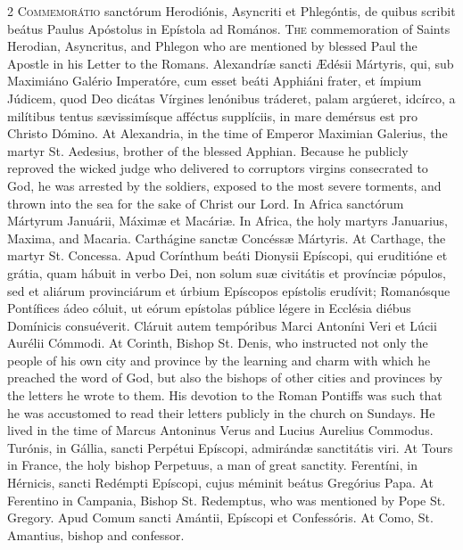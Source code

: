 \begin{paracol}{2}
\lettrine[lines=2]{C}{ommemorátio} sanctórum 
 Herodiónis, Asyncriti et Phlegóntis, de quibus scribit beátus Paulus 
 Apóstolus in Epístola ad Romános.
\switchcolumn
{}
\lettrine[lines=2]{T}{he} commemoration of Saints 
 Herodian, Asyncritus, and Phlegon who are mentioned by blessed Paul the 
 Apostle in his Letter to the Romans.
\switchcolumn*
{}
Alexandríæ sancti 
 Ædésii Mártyris, qui, sub Maximiáno Galério Imperatóre, cum esset beáti 
 Apphiáni frater, et ímpium Júdicem, quod Deo dicátas Vírgines lenónibus 
 tráderet, palam argúeret, idcírco, a milítibus tentus sævissimísque afféctus 
 supplíciis, in mare demérsus est pro Christo Dómino.
\switchcolumn
{}
At Alexandria, in the time of 
 Emperor Maximian Galerius, the martyr St. Aedesius, brother of the blessed 
 Apphian. Because he publicly reproved the wicked judge who delivered 
 to corruptors virgins consecrated to God, he was arrested by the soldiers, 
 exposed to the most severe torments, and thrown into the sea for the sake of 
 Christ our Lord.
\switchcolumn*
{}
In Africa sanctórum 
 Mártyrum Januárii, Máximæ et Macáriæ.
\switchcolumn
{}
In Africa, the holy martyrs 
 Januarius, Maxima, and Macaria.
\switchcolumn*
{}
Carthágine sanctæ 
 Concéssæ Mártyris.
\switchcolumn
{}
At Carthage, the martyr St. 
 Concessa.
\switchcolumn*
{}
Apud Corínthum beáti 
 Dionysii Epíscopi, qui eruditióne et grátia, quam hábuit in verbo Dei, non 
 solum suæ civitátis et provínciæ pópulos, sed et aliárum provinciárum et 
 úrbium Epíscopos epístolis erudívit; Romanósque Pontífices 
 ádeo cóluit, ut 
 eórum epístolas públice légere in Ecclésia diébus Domínicis consuéverit. 
 Cláruit autem tempóribus Marci Antoníni Veri et Lúcii Aurélii Cómmodi.
\switchcolumn
{}
At Corinth, Bishop St. Denis, who 
 instructed not only the people of his own city and province by the learning 
 and charm with which he preached the word of God, but also the bishops of 
 other cities and provinces by the letters he wrote to them. His 
 devotion to the Roman Pontiffs was such that he was accustomed to read their 
 letters publicly in the church on Sundays. He lived in the time of 
 Marcus Antoninus Verus and Lucius Aurelius Commodus.
\switchcolumn*
{}
Turónis, in Gállia, 
 sancti Perpétui Epíscopi, admirándæ sanctitátis viri.
\switchcolumn
{}
At Tours in France, the holy bishop 
 Perpetuus, a man of great sanctity.
\switchcolumn*
{}
Ferentíni, in Hérnicis, 
 sancti Redémpti Epíscopi, cujus méminit beátus Gregórius Papa.
\switchcolumn
{}
At Ferentino in Campania, Bishop 
 St. Redemptus, who was mentioned by Pope St. Gregory.
\switchcolumn*
{}
Apud Comum sancti 
 Amántii, Epíscopi et Confessóris.
\switchcolumn
{}
At Como, St. Amantius, bishop and 
 confessor.
\switchcolumn*
{}
\end{paracol}


